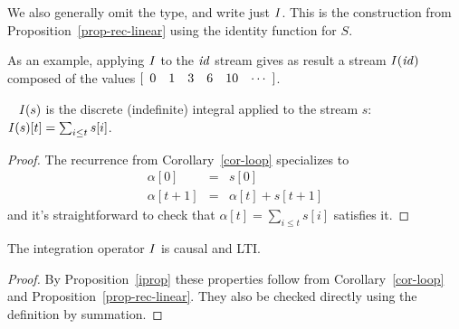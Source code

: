 \noindent
We also generally omit the type, and write just $\I$.
This is the construction from Proposition~\ref{prop-rec-linear}
using the identity function for $S$.

\begin{center}
\end{center}

As an example, applying $\I$ to the $\mathit{id}$ stream gives as result
a stream $\mathit{I}(\mathit{id})$ composed of the values $\sv{0 1 3 6 10}$.

\begin{proposition}~\label{iprop}
$\mathit{I}(s)$ is the discrete (indefinite) integral applied to the stream $s$:
$\mathit{I}(s)[t] = \sum_{i \leq t} s[i]$.
\end{proposition}
\begin{proof} The recurrence from Corollary~\ref{cor-loop} specializes to
\begin{eqnarray*}
\alpha[0]  & = & s[0]\\
\alpha[t+1] & = & \alpha[t] + s[t+1]
\end{eqnarray*}
and it's straightforward to check that $\alpha[t]= \sum_{i \leq t} s[i]$ satisfies
it.
\end{proof}

\begin{proposition}[Properties of $\I$]
\label{prop-integ-properties}
The integration operator $\I$ is causal and LTI.
\end{proposition}
\begin{proof}
By Proposition~\ref{iprop} these properties follow from Corollary~\ref{cor-loop} and Proposition~\ref{prop-rec-linear}.  They also be checked directly using
the definition by summation.
\end{proof}



